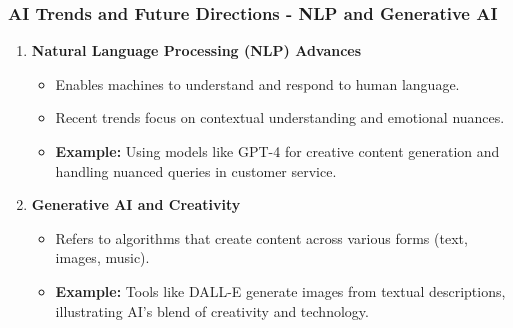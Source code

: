 \documentclass[aspectratio=169]{beamer}
\begin{document}
\begin{frame}[fragile]
    \frametitle{AI Trends and Future Directions - NLP and Generative AI}
    \begin{enumerate}
        \item \textbf{Natural Language Processing (NLP) Advances}  
        \begin{itemize}
            \item Enables machines to understand and respond to human language. 
            \item Recent trends focus on contextual understanding and emotional nuances.
            \item \textbf{Example:} Using models like GPT-4 for creative content generation and handling nuanced queries in customer service.
        \end{itemize}

        \item \textbf{Generative AI and Creativity}  
        \begin{itemize}
            \item Refers to algorithms that create content across various forms (text, images, music).
            \item \textbf{Example:} Tools like DALL-E generate images from textual descriptions, illustrating AI's blend of creativity and technology.
        \end{itemize}
    \end{enumerate}
\end{frame}
\end{document}

